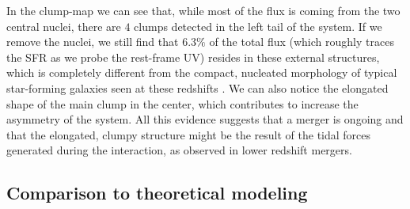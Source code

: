 \documentclass[sn-mathphys]{sn-jnl}%
\theoremstyle{thmstyleone}%
\theoremstyle{thmstyletwo}%
\theoremstyle{thmstylethree}%
\begin{document}
In the clump-map we can see that, while most of the flux is coming from the two central nuclei, there are $4$ clumps detected in the left tail of the system. If we remove the nuclei, we still find that $6.3 \%$ of the total flux (which roughly traces the SFR as we probe the rest-frame UV) resides in these external structures, which is completely different from the compact, nucleated morphology of typical star-forming galaxies seen at these redshifts \citep{Treu23}. We can also notice the elongated shape of the main clump in the center, which contributes to increase the asymmetry of the system.
All this evidence suggests that a merger is ongoing and that the elongated, clumpy structure might be the result of the tidal forces generated during the interaction, as observed in lower redshift mergers.


\subsection{Comparison to theoretical modeling}\label{sec:theory}
\end{document}
